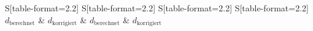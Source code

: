 \begin{table}
    \centering
    \caption{Aus den A-Scans bestimmte Abstände der Löcher zum Rand in \si{\milli\meter}}
    \label{tab:werteA}
    \begin{tabular}{
	S[table-format=2.2]
	S[table-format=2.2]
	S[table-format=2.2]
	S[table-format=2.2]
	}
	\toprule
	{$d_\text{berechnet}$}		& {$d_\text{korrigiert}$}		& 
	{$d_\text{berechnet}$}		& {$d_\text{korrigiert}$}		\\ 
	\midrule
    
    \bottomrule
    \end{tabular}
    \end{table}
